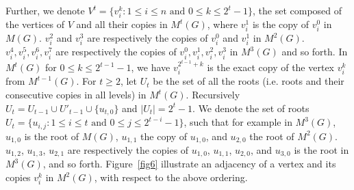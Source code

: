 \documentclass{article}
\newtheorem{open problem} {Open Problem}
\numberwithin{lemma}{section}
\numberwithin{theorem}{section}
\numberwithin{cor}{section}
\numberwithin{prop}{section}
\numberwithin{con}{section}
\numberwithin{claim}{section}
\numberwithin{obs}{section}
\numberwithin{dnt}{section}
\begin{document}
Further, we denote $V^t=\{v^k_i : 1\leq i\leq n \text{ and } 0\leq k\leq 2^t-1 \}$, the set composed of the vertices of $V$ and all their copies in $M^t(G)$, where $v^1_i$ is the copy of $v^0_i$ in $M(G)$. $v^2_i$ and $v^3_i$ are respectively the copies of $v^0_i$ and $v^1_i$ in $M^2(G)$. $v^4_i,v^5_i,v^6_i,v^7_i$ are respectively the copies of  $v^0_i,v^1_i,v^2_i,v^3_i$ in $M^3(G)$ and so forth. In $M^t(G)$ for $0 \leq k \leq 2^{t-1}-1 $, we have $v_i^{2^{t-1}+k}$ is the exact copy of the vertex $v_i^k$ from $M^{t-1}(G)$.  For $t\geq 2$, let $U_t$ be the set of all the roots (i.e. roots and their consecutive copies in all levels) in $M^t(G)$. Recursively $U_t=U_{t-1}\cup U'_{t-1}\cup \{u_{t,0}\}$ and $|U_t|=2^t-1$. We denote the set of roots $U_t=\{u_{i,j}: 1\leq i\leq t \text{ and } 0\leq j\leq 2^{t-i}-1 \}$,  such that for example in $M^3(G)$, $u_{1,0}$ is the root of $M(G)$, $u_{1,1}$ the copy of $u_{1,0}$, and $u_{2,0}$ the root of $M^2(G)$. $u_{1,2}$, $u_{1,3}$, $u_{2,1}$ are respectively the copies of $u_{1,0}$, $u_{1,1}$, $u_{2,0}$, and $u_{3,0}$ is the root in $M^3(G)$, and so forth. Figure~\ref{fig6} illustrate an adjacency of a vertex and its copies $v^k_i$ in $M^2(G)$, with respect to the above ordering.
\end{document}
